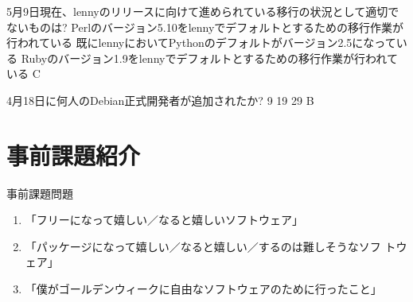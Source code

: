 \documentclass[cjk,dvipdfmx,12pt]{beamer}
\begin{document}
 \santaku
 {5月9日現在、lennyのリリースに向けて進められている移行の状況として適切でないものは?}
 {Perlのバージョン5.10をlennyでデフォルトとするための移行作業が行われている}
 {既にlennyにおいてPythonのデフォルトがバージョン2.5になっている}
 {Rubyのバージョン1.9をlennyでデフォルトとするための移行作業が行われている}
 {C}
 
 \santaku
 {4月18日に何人のDebian正式開発者が追加されたか?}
 {9}
 {19}
 {29}
 {B}

\section{事前課題紹介}

\begin{frame}{事前課題問題}

\begin{enumerate}
 \item 「フリーになって嬉しい／なると嬉しいソフトウェア」
 \item 「パッケージになって嬉しい／なると嬉しい／するのは難しそうなソフ
       トウェア」
 \item 「僕がゴールデンウィークに自由なソフトウェアのために行ったこと」
\end{enumerate}

\end{frame}

\end{document}
